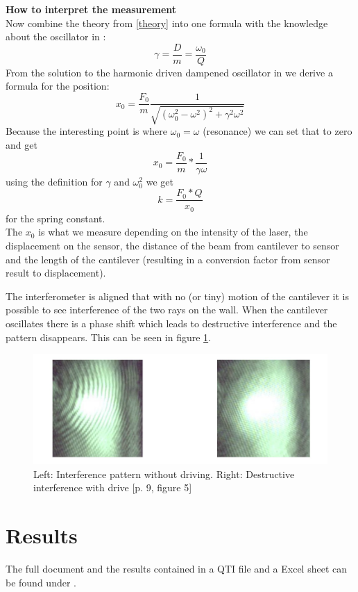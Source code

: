 \documentclass[12pt,a4paper]{article}
\begin{document}
\begin{multicols}{2}
\noindent
\textbf{How to interpret the measurement}\\
Now combine the theory from \ref{theory} into one formula with the knowledge about the oscillator in \cite{physikwiki}:
$$\gamma = \frac{D}{m} = \frac{\omega_0}{Q}$$
From the solution to the harmonic driven dampened oscillator in \cite{physikwiki} we derive a formula for the position:
$$x_0 = \frac{F_0}{m}  \frac{1}{\sqrt{ (\omega_0^2 - \omega^2 )^2 + \gamma^2  \omega^2}}$$
Because the interesting point is where $\omega_0 = \omega$ (resonance) we can set that to zero and get
$$x_0 = \frac{F_0}{m} * \frac{1}{\gamma  \omega}$$
using the definition for $\gamma$ and $\omega_0^2$ we get
$$k = \frac{F_0 * Q}{x_0}$$
for the spring constant.\\
The $x_0$ is what we measure depending on the intensity of the laser, the displacement on the sensor, the distance of the beam from cantilever to sensor and the length of the cantilever (resulting in a conversion factor from sensor result to displacement).

The interferometer is aligned that with no (or tiny) motion of the cantilever it is possible to see interference of the two rays on the wall. When the cantilever oscillates there is a phase shift which leads to destructive interference and the pattern disappears. This can be seen in figure \ref{fig:pattern}.

\begin{figure}[H]
	\centering
	\includegraphics[scale=0.6]{../figures/interference.png}
	\caption{Left: Interference pattern without driving. Right: Destructive interference with drive \cite{physikwiki}[p. 9, figure 5]}
	\label{fig:pattern}
\end{figure}
\section{Results}
The full document and the results contained in a QTI file and a Excel sheet can be found under \cite{github}.


\end{multicols}
\end{document}
